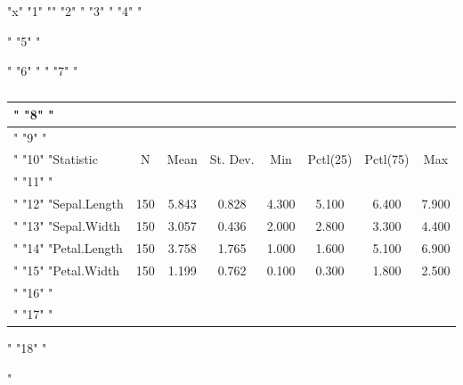 "x"
"1" ""
"2" "%
"3" "%
"4" "\begin{table}[!htbp] \centering "
"5" "  \caption{} "
"6" "  \label{} "
"7" "\begin{tabular}{@{\extracolsep{5pt}}lccccccc} "
"8" "\\[-1.8ex]\hline "
"9" "\hline \\[-1.8ex] "
"10" "Statistic & \multicolumn{1}{c}{N} & \multicolumn{1}{c}{Mean} & \multicolumn{1}{c}{St. Dev.} & \multicolumn{1}{c}{Min} & \multicolumn{1}{c}{Pctl(25)} & \multicolumn{1}{c}{Pctl(75)} & \multicolumn{1}{c}{Max} \\ "
"11" "\hline \\[-1.8ex] "
"12" "Sepal.Length & 150 & 5.843 & 0.828 & 4.300 & 5.100 & 6.400 & 7.900 \\ "
"13" "Sepal.Width & 150 & 3.057 & 0.436 & 2.000 & 2.800 & 3.300 & 4.400 \\ "
"14" "Petal.Length & 150 & 3.758 & 1.765 & 1.000 & 1.600 & 5.100 & 6.900 \\ "
"15" "Petal.Width & 150 & 1.199 & 0.762 & 0.100 & 0.300 & 1.800 & 2.500 \\ "
"16" "\hline \\[-1.8ex] "
"17" "\end{tabular} "
"18" "\end{table} "
